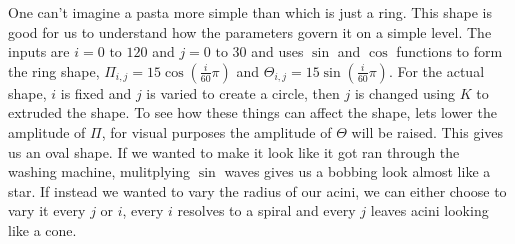 {}
\markdownRendererSectionEnd \markdownRendererSectionBegin
{}\markdownRendererInterblockSeparator
{}One can't imagine a pasta more simple than  which is just a ring. This shape is good for us to understand how the parameters govern it on a simple level. The inputs are $i = 0 \text{ to } 120$ and $j = 0 \text{ to } 30$ and uses $\sin$ and $\cos$ functions to form the ring shape, $\Pi_{i,j}=15\cos\left(\frac{i}{60}\pi\right)$ and $\Theta_{i,j}=15\sin\left(\frac{i}{60}\pi\right)$.\markdownRendererInterblockSeparator
{}\markdownRendererInterblockSeparator
{}For the actual shape, $i$ is fixed and $j$ is varied to create a circle, then $j$ is changed using $K$ to extruded the shape. To see how these things can affect the shape, lets lower the amplitude of $\Pi$, for visual purposes the amplitude of $\Theta$ will be raised. This gives us an oval shape. If we wanted to make it look like it got ran through the washing machine, mulitplying $\sin$ waves gives us a bobbing look almost like a star. If instead we wanted to vary the radius of our acini, we can either choose to vary it every $j$ or $i$, every $i$ resolves to a spiral and every $j$ leaves acini looking like a cone.\markdownRendererInterblockSeparator
{}
\markdownRendererSectionEnd 
\markdownRendererSectionEnd \markdownRendererDocumentEnd